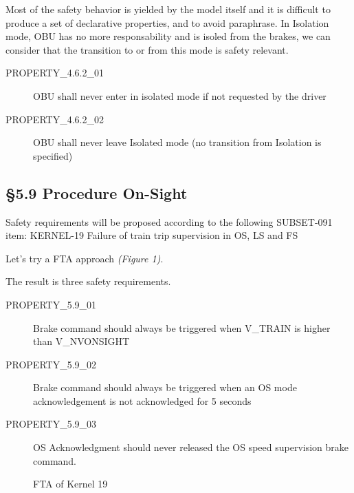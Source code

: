 \documentclass{template/openetcs_report}
\begin{document}
Most of the safety behavior is yielded by the model itself and it is difficult to produce a set of declarative properties, and to avoid paraphrase. In Isolation mode, OBU has no more responsability and is isoled from the brakes, we can consider that the transition to or from this mode is safety relevant. 
\begin{description}
\item [PROPERTY\_4.6.2\_01] OBU shall never enter in isolated mode if not requested by the driver
\item [PROPERTY\_4.6.2\_02] OBU shall never leave Isolated mode (no transition from Isolation is specified)
\end{description}

\subsection{\S5.9 Procedure On-Sight}
Safety requirements will be proposed according to the following SUBSET-091 item:
\newline KERNEL-19 Failure of train trip supervision in OS, LS and FS

Let's try a FTA approach \emph{(Figure 1)}.

The result is three safety requirements.
\begin{description}
\item [PROPERTY\_5.9\_01] Brake command should always be triggered when V\_TRAIN is higher than V\_NVONSIGHT
\item [PROPERTY\_5.9\_02] Brake command should always be triggered when an OS mode acknowledgement is not acknowledged for 5 seconds
\item [PROPERTY\_5.9\_03] OS Acknowledgment should never released the OS speed supervision brake command.
\end{description}

\begin{figure}  
\centering  
{}  
\caption{FTA of Kernel 19}  
\label{fig:FTA_of_kernel_19}
\end{figure}
\end{document}
